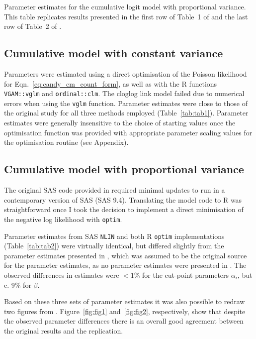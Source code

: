 \begin{table}[tbp]
  \small
    \centering
    \caption{Parameter estimates for the cumulative logit model with proportional variance. 
    This table replicates results presented in the first row of Table~1 of  \citep{kemp1986stochastic} and the last row of Table~2 of \citep{candy1991modeling}.}
  
  \label{tab:tab2}
\end{table}


\subsection{Cumulative model with constant variance}
Parameters were estimated using a direct optimisation of the Poisson likelihood for Eqn.~\ref{eq:candy_cm_count_form}, as well as with the R functions \verb+VGAM::vglm+ and \verb+ordinal::clm+. 
The cloglog link model failed due to numerical errors when using the \verb+vglm+ function. 
Parameter estimates were close to those of the original study for all three methods employed (Table~\ref{tab:tab1}). Parameter estimates were generally insensitive to the choice of starting values once the optimisation function was provided with appropriate parameter scaling values for the optimisation routine (see Appendix).

\subsection{Cumulative model with proportional variance}
The original SAS code provided in \citep{dennis1986stochastic} required minimal updates to run in a contemporary version of SAS (SAS 9.4). 
Translating the model code to R was straightforward once I took the decision to implement a direct minimisation of the negative log likelihood with \verb+optim+.  

Parameter estimates from SAS \verb+NLIN+ and both R \verb+optim+ implementations (Table~\ref{tab:tab2}) were virtually identical, but differed slightly from the parameter estimates presented in \citep{kemp1986stochastic}, which was assumed to be the original source for the parameter estimates, as no parameter estimates were presented in \citep{dennis1986stochastic}. 
The observed differences in estimates were $<1$\% for the cut-point parameters $\alpha_i$, but c. 9\% for $\beta$.

Based on these three sets of parameter estimates it was also possible to redraw two figures from \citep{dennis1986stochastic}. 
Figure~\ref{fig:fig1} and~\ref{fig:fig2}, respectively, show that despite the observed parameter differences  there is an overall good agreement between the original results and the replication.

